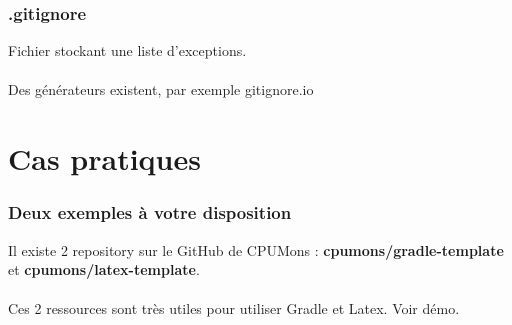 \documentclass{beamer}
\begin{document}

\begin{frame}\frametitle{.gitignore}
    Fichier stockant une liste d'exceptions. \\~\\

    Des générateurs existent, par exemple gitignore.io
\end{frame}

\section{Cas pratiques} %

\begin{frame}\frametitle{Deux exemples à votre disposition}
    Il existe 2 repository sur le GitHub de CPUMons : \textbf{cpumons/gradle-template} et \textbf{cpumons/latex-template}. \\~\\

    Ces 2 ressources sont très utiles pour utiliser Gradle et Latex. Voir démo.
\end{frame}

\end{document}
